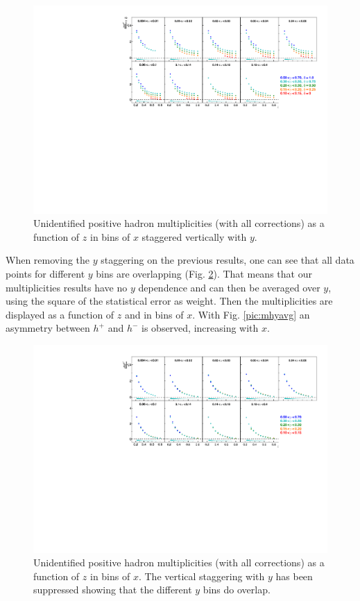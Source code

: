 \begin{figure}[!h]
  \centering
	\includegraphics[scale=0.85]{./gfx/hm.pdf}
	\caption{Unidentified positive hadron multiplicities (with all corrections) as a function of $z$ in bins of $x$ staggered vertically with $y$.}
	\label{pic:mhm}
\end{figure}

When removing the $y$ staggering on the previous results, one can see that all data points for different $y$ bins are overlapping (Fig. \ref{pic:mhnoy}). That means that our multiplicities results have no $y$ dependence and can then be averaged over $y$, using the square of the statistical error as weight. Then the multiplicities are displayed as a function of $z$ and in bins of $x$. With Fig. \ref{pic:mhyavg} an asymmetry between $h^+$ and $h^-$ is observed, increasing with $x$.

\begin{figure}[!h]
  \centering
	\includegraphics[scale=0.85]{./gfx/hnoystag.pdf}
	\caption{Unidentified positive hadron multiplicities (with all corrections) as a function of $z$ in bins of $x$. The vertical staggering with $y$ has been suppressed showing that the different $y$ bins do overlap.}
	\label{pic:mhnoy}
\end{figure}

